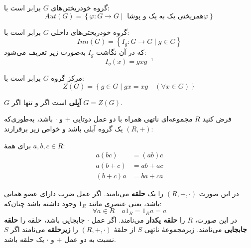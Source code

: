 \begin{frame}
    \begin{definition}
        گروه خودریختی‌های $G$ برابر است با:
        \[
            Aut(G) = \left\{ \varphi \colon G \to G \mid  \text{ همریختی یک به یک و پوشا} \varphi \right\}
        \]
    \end{definition}

    \begin{definition}
        گروه خودریختی‌های داخلی $G$ برابر است با:
        \[
            Inn(G) = \left\{ I_g \colon G \to G \mid g \in G \right\}
        \]
        که در آن نگاشت $I_g$ به‌صورت زیر تعریف می‌شود:
        \[
            I_g(x) = gxg^{-1}
        \]
    \end{definition}

\end{frame}


\begin{frame}
    \begin{definition}
        مرکز گروه $G$ برابر است با:
        \[
            Z(G) = \left\{ g \in G \mid gx = xg \quad (\forall x \in G) \right\}
        \]
    \end{definition}

    \begin{remark}
        $G$ \textbf{آبِلی} است اگر و تنها اگر $G = Z(G)$.
    \end{remark}




\end{frame}

\begin{frame}
    \begin{definition}[حلقه]
        فرض کنید $R$ مجموعه‌ای ناتهی همراه با دو عمل دوتایی $+$ و $\cdot$ باشد، به‌طوری‌که $(R, +)$ یک گروه آبلی باشد و خواص زیر برقرارند:

        برای همهٔ $a,b,c \in R$:
        \begin{align}
            a(bc)    & = (ab)c \tag{1}   \\
            a(b + c) & = ab + ac \tag{2} \\
            (b + c)a & = ba + ca \tag{3}
        \end{align}

        در این صورت $(R, +, \cdot)$ را یک \textbf{حلقه} می‌نامند.
        اگر عمل ضرب دارای عضو همانی باشد، یعنی عنصری مانند $1_R$ وجود داشته باشد چنان‌که:
        \[
            \forall a \in R \quad a 1_R = 1_R a = a
        \]
        در این صورت، $R$ را \textbf{حلقه یکدار} می‌نامند.
        اگر عمل $\cdot$ جابجایی باشد، حلقه را \textbf{حلقه جابجایی} می‌نامند.
        زیرمجموعهٔ ناتهی $S$ از حلقهٔ $(R, +, \cdot)$ را \textbf{زیرحلقه} می‌نامند اگر $S$ نسبت به دو عمل $+$ و $\cdot$ یک حلقه باشد.

    \end{definition}
\end{frame}


